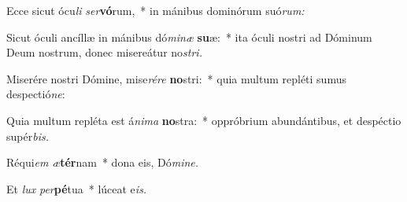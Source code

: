 \item Ecce sicut ócu\textit{li} \textit{ser}\textbf{vó}rum,~* in mánibus dominórum suó\textit{rum:}
\item Sicut óculi ancíllæ in mánibus dó\textit{minæ} \textbf{su}æ:~* ita óculi nostri ad Dóminum Deum nostrum, donec misereátur no\tinyhspace\textit{stri.}
\item Miserére nostri Dómine, mise\textit{rére} \textbf{no}stri:~* quia multum repléti sumus despectió\textit{ne}:
\item Quia multum repléta est á\tinyhspace\textit{nima} \textbf{no}stra:~* oppróbrium abundántibus, et despéctio supér\textit{bis.}
\item Réqui\tinyhspace\textit{em} \textit{æ}\textbf{tér}nam~* dona eis, Dó\textit{mine.}
\item Et \textit{lux} \textit{per}\textbf{pé}tua~* lúceat e\tinyhspace\textit{is.}